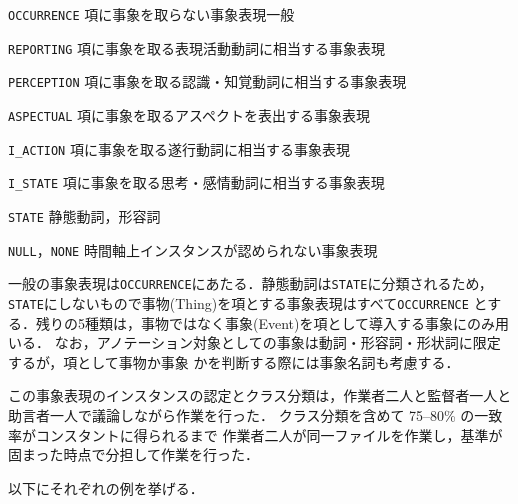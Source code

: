 \documentclass[japanese]{jnlp_1.4}
\newcommand{\modified}[1]{}
\begin{document}
\begin{list}{}{}
\item[\tt OCCURRENCE] 項に事象を取らない事象表現一般
\item[\tt REPORTING] 項に事象を取る表現活動動詞に相当する事象表現
\item[\tt PERCEPTION] 項に事象を取る認識・知覚動詞に相当する事象表現
\item[\tt ASPECTUAL] 項に事象を取るアスペクトを表出する事象表現
\item[\tt I\_ACTION] 項に事象を取る遂行動詞に相当する事象表現
\item[\tt I\_STATE] 項に事象を取る思考・感情動詞に相当する事象表現
\item[\tt STATE] 静態動詞，形容詞
\item[{\tt NULL}，{\tt NONE}] 時間軸上インスタンスが認められない事象表現
\end{list}

一般の事象表現は{\tt OCCURRENCE}にあたる．静態動詞は{\tt STATE}に分類されるため，
{\tt STATE}にしないもので事物(Thing)を項とする事象表現はすべて{\tt OCCURRENCE}
とする．残りの5種類は，事物ではなく事象(Event)を項として導入する事象にのみ用いる．
なお，アノテーション対象としての事象は動詞・形容詞・形状詞に限定するが，項として事物か事象
かを判断する際には事象名詞も考慮する．

この事象表現のインスタンスの認定とクラス分類は，作業者二人と監督者一人と助言者一人で議論しながら作業を行った．
クラス分類を含めて 75--80\% の一致率がコンスタントに得られるまで
作業者二人が同一ファイルを作業し，基準が固まった時点で分担して作業を行った．
\modified{基準の策定にあたっては日本語学・言語学の文献\cite{工藤1995,工藤2004,中村2001}に
ある事象表現の分類を参考にした．}

以下にそれぞれの例を挙げる．
\end{document}
